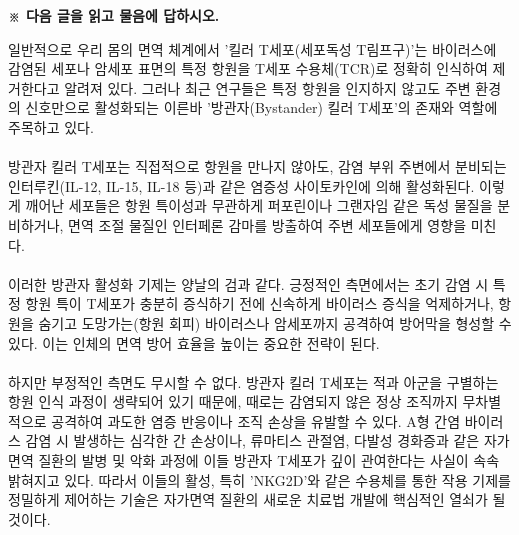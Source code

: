 \documentclass[10pt,a4paper]{article}
\begin{document}
\vspace{4mm}
{\small\textbf{※ 다음 글을 읽고 물음에 답하시오.}}
\vspace{2mm}
\begin{tcolorbox}[passage]
일반적으로 우리 몸의 면역 체계에서 '킬러 T세포(세포독성 T림프구)'는 바이러스에 감염된 세포나 암세포 표면의 특정 항원을 T세포 수용체(TCR)로 정확히 인식하여 제거한다고 알려져 있다. 그러나 최근 연구들은 특정 항원을 인지하지 않고도 주변 환경의 신호만으로 활성화되는 이른바 '방관자(Bystander) 킬러 T세포'의 존재와 역할에 주목하고 있다. \\{}
\vspace{4pt} \\{}
방관자 킬러 T세포는 직접적으로 항원을 만나지 않아도, 감염 부위 주변에서 분비되는 인터루킨(IL-12, IL-15, IL-18 등)과 같은 염증성 사이토카인에 의해 활성화된다. 이렇게 깨어난 세포들은 항원 특이성과 무관하게 퍼포린이나 그랜자임 같은 독성 물질을 분비하거나, 면역 조절 물질인 인터페론 감마를 방출하여 주변 세포들에게 영향을 미친다. \\{}
\vspace{4pt} \\{}
이러한 방관자 활성화 기제는 양날의 검과 같다. 긍정적인 측면에서는 초기 감염 시 특정 항원 특이 T세포가 충분히 증식하기 전에 신속하게 바이러스 증식을 억제하거나, 항원을 숨기고 도망가는(항원 회피) 바이러스나 암세포까지 공격하여 방어막을 형성할 수 있다. 이는 인체의 면역 방어 효율을 높이는 중요한 전략이 된다. \\{}
\vspace{4pt} \\{}
하지만 부정적인 측면도 무시할 수 없다. 방관자 킬러 T세포는 적과 아군을 구별하는 항원 인식 과정이 생략되어 있기 때문에, 때로는 감염되지 않은 정상 조직까지 무차별적으로 공격하여 과도한 염증 반응이나 조직 손상을 유발할 수 있다. A형 간염 바이러스 감염 시 발생하는 심각한 간 손상이나, 류마티스 관절염, 다발성 경화증과 같은 자가면역 질환의 발병 및 악화 과정에 이들 방관자 T세포가 깊이 관여한다는 사실이 속속 밝혀지고 있다. 따라서 이들의 활성, 특히 'NKG2D'와 같은 수용체를 통한 작용 기제를 정밀하게 제어하는 기술은 자가면역 질환의 새로운 치료법 개발에 핵심적인 열쇠가 될 것이다.
\end{tcolorbox}
\vspace{3mm}
\end{document}
